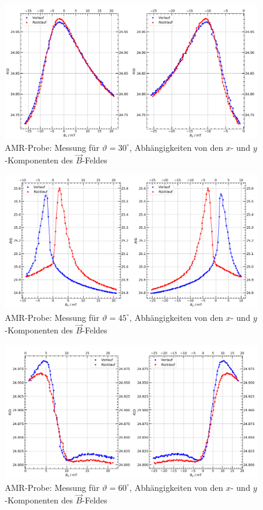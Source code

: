 \documentclass[german,  %
parskip=full,  %
]{scrartcl}
\begin{document}
\newpage
\begin{figure}[h!]\centering
\includegraphics[width=\textwidth]{Probe1_30_Grad.png}
\caption{AMR-Probe: Messung für \(\vartheta=30^{\circ}\), Abhängigkeiten von den \(x\)- und \(y\)-Komponenten des \(\vec{B}\)-Feldes}
\end{figure} 
\begin{figure}[h!]\centering
\includegraphics[width=\textwidth]{Probe1_45_Grad.png}
\caption{AMR-Probe: Messung für \(\vartheta=45^{\circ}\), Abhängigkeiten von den \(x\)- und \(y\)-Komponenten des \(\vec{B}\)-Feldes}
\end{figure} 
\newpage
\begin{figure}[h!]\centering
\includegraphics[width=\textwidth]{Probe1_60_Grad.png}
\caption{AMR-Probe: Messung für \(\vartheta=60^{\circ}\), Abhängigkeiten von den \(x\)- und \(y\)-Komponenten des \(\vec{B}\)-Feldes}
\end{figure} 
\end{document}
